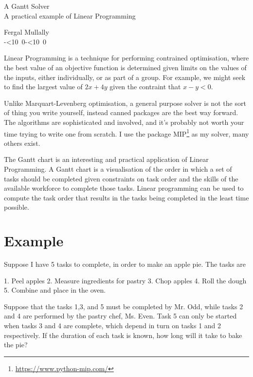 \documentclass[12pt]{article}
\def\mydate{\leavevmode\hbox{\the\year-\twodigits\month-\twodigits\day}}
\def\twodigits#1{\ifnum#1<10 0\fi\the#1}
\begin{document}
\setlength{\parskip}{1.5ex plus0.5ex minus0.2ex}


\begin{center}
{\Large A Gantt Solver} \\
{\large A practical example of Linear Programming}
\end{center}
\begin{flushright}Fergal Mullally\\ \mydate\end{flushright}

Linear Programming is a technique for performing contrained optimisation, where the best value of an objective function is determined given limits on the values of the inputs, either individually, or as part of a group. For example, we might seek to find the largest value of $2x + 4y$ given the contraint that $x-y < 0$.

Unlike Marquart-Levenberg optimisation, a general purpose solver is not the sort of thing you write yourself, instead canned packages are the best way forward. The algorithms are sophisticated and involved, and it's probably not worth your time trying to write one from scratch. I use the package MIP\footnote{\url{https://www.python-mip.com/}} as my solver, many others exist.


The Gantt chart is an interesting and practical application of Linear Programming. A Gantt chart is a visualisation of the order in which a set of tasks should be completed given constraints on task order and the skills of the available workforce to complete those tasks. Linear programming can be used to compute the task order that results in the tasks being completed in the least time possible.


\section*{Example}
Suppose I have 5 tasks to complete, in order to make an apple pie. The tasks are

1. Peel apples
2. Measure ingredients for pastry
3. Chop apples 
4. Roll the dough
5. Combine and place in the oven.

Suppose that the tasks 1,3, and 5 must be completed by Mr. Odd, while tasks 2 and 4 are performed by the pastry chef, Ms. Even. Task 5 can only be started when tasks 3 and 4 are complete, which depend in turn on tasks 1 and 2 respectively. If the duration of each task is known, how long will it take to bake the pie?
\end{document}
